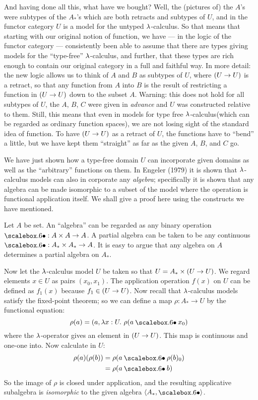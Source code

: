 And having done all this, what have we bought? Well, the (pictures of) the $A$'s were
subtypes of the $A_*$'s which are both retracts and subtypes of $U$, and in the functor
category $U$ is a model for the untyped $\lambda$-calculus. So that means that starting with
our original notion of function, we have --- in the logic of the functor category ---
consistently been able to assume that there are types giving models for the ``type-free''
$\lambda$-calculus, and further, that these types are rich enough to contain our original
category in a full and faithful way. In more detail: the new logic allows us to think of
$A$ and $B$ as subtypes of $U$, where $(U\rightarrow U)$ is a retract, so that any function from $A$
into $B$ is the result of restricting a function in $(U\rightarrow U)$ down to the subset $A$. Warning:
this does not hold for all subtypes of $U$, the $A$, $B$, $C$ were given in {\it advance}
and $U$ was constructed relative to them. Still, this means that even in models for type
free $\lambda$-calculus(which can be regarded as ordinary function spaces), we are not losing
sight of the standard idea of function. To have $(U\rightarrow U)$ as a retract of $U$, the functions
have to ``bend'' a little, but we have kept them ``straight'' as far as the given $A$,
$B$, and $C$ go.

We have just shown how a type-free domain $U$ can incorporate given domains as well as the
``arbitrary'' functions on them. In Engeler (1979) it is shown that $\lambda$-calculus models
can also in corporate any {\it algebra}; specifically it is shown that any algebra can be
made isomorphic to a subset of the model where the operation is functional application
itself. We shall give a proof here using the constructs we have mentioned.

Let $A$ be set. An ``algebra'' can be regarded as any binary operation $\dotop : A\times
A\to A$. A partial algebra can be taken to be any continuous $\dotop : A_* \times A_* \to
A$. It is easy to argue that any algebra on $A$ determines a partial algebra on $A_*$.

Now let the $\lambda$-calculus model $U$ be taken so that $U = A_* \times  (U\rightarrow U)$. We regard
elements $x \in U$ as pairs $(x_0 , x_1 )$. The application operation $f(x)$ on $U$ can be
defined as $f_1(x)$ because $f_1 \in (U\rightarrow U)$. Now recall that $\lambda$-calculus models satisfy
the fixed-point theorem; so we can define a map $\rho: A_*\to U$ by the functional
equation:
$$
\rho(a)  =  (a, \l x: U. \,\,\rho (a \dotop x_0)
$$
where the $\lambda$-operator gives an element in $(U\rightarrow U)$. This map is continuous and one-one
into. Now calculate in $U$:
\begin{align*}
\rho(a)(\rho(b)) &= \rho(a\dotop \rho(b)_0)\\
&= \rho( a  \dotop  b)
\end{align*}
So the image of $\rho$ is closed under application, and the resulting applicative
subalgebra is {\it isomorphic} to the given algebra $\langle A_*, \dotop \rangle$.

